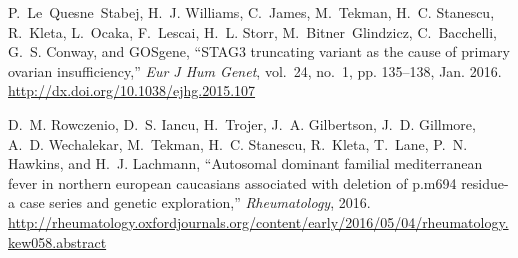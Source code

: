 \begin{thebibliography}{10}
\BIBentryALTinterwordspacing
P.~Le~Quesne~Stabej, H.~J. Williams, C.~James, M.~Tekman, H.~C. Stanescu,
  R.~Kleta, L.~Ocaka, F.~Lescai, H.~L. Storr, M.~Bitner~Glindzicz,
  C.~Bacchelli, G.~S. Conway, and {GOSgene}, ``{STAG}3 truncating variant as
  the cause of primary ovarian insufficiency,'' \emph{Eur J Hum Genet},
  vol.~24, no.~1, pp. 135--138, Jan. 2016.  \url{http://dx.doi.org/10.1038/ejhg.2015.107}
\BIBentrySTDinterwordspacing

\BIBentryALTinterwordspacing
D.~M. Rowczenio, D.~S. Iancu, H.~Trojer, J.~A. Gilbertson, J.~D. Gillmore,
  A.~D. Wechalekar, M.~Tekman, H.~C. Stanescu, R.~Kleta, T.~Lane, P.~N.
  Hawkins, and H.~J. Lachmann, ``Autosomal dominant familial mediterranean
  fever in northern european caucasians associated with deletion of p.m694
  residue-a case series and genetic exploration,'' \emph{Rheumatology}, 2016.
  \url{http://rheumatology.oxfordjournals.org/content/early/2016/05/04/rheumatology.kew058.abstract}
\BIBentrySTDinterwordspacing

\end{thebibliography}
\endgroup

\pagebreak

